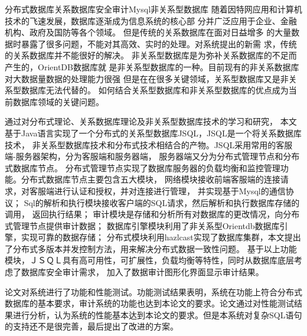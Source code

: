 
\begin{Cabstract}{分布式数据库}{关系数据库}{安全审计}{Mysql}{非关系型数据库}
随着因特网应用和计算机技术的飞速发展，数据库逐渐成为信息系统的核心部
分并广泛应用于企业、金融机构、政府及国防等各个领域。
但是传统的关系数据库在面对日益增多
的大量数据时暴露了很多问题，不能对其高效、实时的处理。对系统提出的新需
求，传统的关系数据库并不能很好的解决。
非关系型数据库是为弥补关系数据库的不足而产生的，OrientDB数据库就
是非关系型数据库的一种。目前现有的非关系数据库对大数据量数据的处理能力很强
但是在在很多关键领域，关系型数据库又是非关系型数据库无法代替的。
如何结合关系型数据库和非关系型数据库的优点成为当前数据库领域的关键问题。

通过对分布式理论、关系数据库理论及非关系型数据库技术的学习和研究，
本文基于Java语言实现了一个分布式的关系型数据库JSQL，JSQL是一个将关系数据库技术，
非关系型数据库技术和分布式技术相结合的产物。JSQL采用常用的客服端-服务器架构，分为客服端和服务器端，
服务器端又分为分布式管理节点和分布式数据库节点。
分布式管理节点实现了数据库服务器的负载均衡和监控管理功能。分布式数据库节点主要包含五大模块，
网络模块接收前端客服端的连接请求，对客服端进行认证和授权，并对连接进行管理，
并实现基于Mysql的通信协议；
Sql的解析和执行模块接收客户端的SQL请求，然后解析和执行数据库存储的调用，
返回执行结果；
审计模块是存储和分析所有对数据库的更改情况，向分布式管理节点提供审计数据；
数据库引擎模块利用了非关系型Orientdb数据库引擎，实现可靠的数据存储；
分布式模块利用hazlcast实现了数据库集群，本文提出了分布式多版本并发控制方法，用来解决分布式数据一致性问题。
基于以上功能模块，ＪＳＱＬ具有高可用性，可扩展性，负载均衡等特性，同时从数据库底层考虑了数据库安全审计需求，
加入了数据审计图形化界面显示审计结果。

论文对系统进行了功能和性能测试。功能测试结果表明，系统在功能上符合分布式数据库的基本要求，审计系统的功能也达到本论文的要求。论文通过对性能测试结果进行分析，认为系统的性能基本达到本论文的要求。但是本系统对复杂SQL语句的支持还不是很完善，最后提出了改进的方案。
\end{Cabstract}